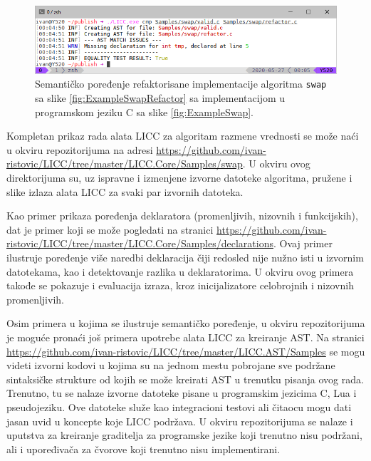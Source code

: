 \begin{figure}[h!]
\centering
\includegraphics[scale=0.75]{images/eval/cmp_refactor.png}
\caption{Semantičko poređenje refaktorisane implementacije algoritma \texttt{swap} sa slike \ref{fig:ExampleSwapRefactor} sa implementacijom u programskom jeziku C sa slike \ref{fig:ExampleSwap}.}
\label{fig:ExampleSwapCompareRefactor}
\end{figure}

Kompletan prikaz rada alata LICC za algoritam razmene vrednosti se može naći u okviru repozitorijuma na adresi \url{https://github.com/ivan-ristovic/LICC/tree/master/LICC.Core/Samples/swap}. U okviru ovog direktorijuma su, uz ispravne i izmenjene izvorne datoteke algoritma, pružene i slike izlaza alata LICC za svaki par izvornih datoteka.

Kao primer prikaza poređenja deklaratora (promenljivih, nizovnih i funkcijskih), dat je primer koji se može pogledati na stranici \url{https://github.com/ivan-ristovic/LICC/tree/master/LICC.Core/Samples/declarations}. Ovaj primer ilustruje poređenje više naredbi deklaracija čiji redosled nije nužno isti u izvornim datotekama, kao i detektovanje razlika u deklaratorima. U okviru ovog primera takođe se pokazuje i evaluacija izraza, kroz inicijalizatore celobrojnih i nizovnih promenljivih.

Osim primera u kojima se ilustruje semantičko poređenje, u okviru repozitorijuma je moguće pronaći još primera upotrebe alata LICC za kreiranje AST. Na stranici \url{https://github.com/ivan-ristovic/LICC/tree/master/LICC.AST/Samples} se mogu videti izvorni kodovi u kojima su na jednom mestu pobrojane sve podržane sintaksičke strukture od kojih se može kreirati AST u trenutku pisanja ovog rada. Trenutno, tu se nalaze izvorne datoteke pisane u programskim jezicima C, Lua i pseudojeziku. Ove datoteke služe kao integracioni testovi ali čitaocu mogu dati jasan uvid u koncepte koje LICC podržava. U okviru repozitorijuma se nalaze i uputstva za kreiranje graditelja za programske jezike koji trenutno nisu podržani, ali i upoređivača za čvorove koji trenutno nisu implementirani.
